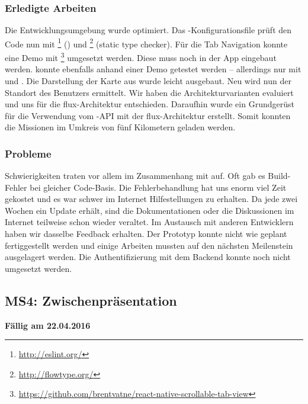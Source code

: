 \subsubsection{Erledigte Arbeiten}
Die Entwicklungsumgebung wurde optimiert. Das -Konfigurationsfile prüft den Code nun mit \footnote{\url{http://eslint.org/}} () und \footnote{\url{http://flowtype.org/}} (static type checker).\newline
Für die Tab Navigation konnte eine Demo mit \footnote{\url{https://github.com/brentvatne/react-native-scrollable-tab-view}} umgesetzt werden. Diese muss noch in der \kort{} App eingebaut werden.\newline
{} konnte ebenfalls anhand einer Demo getestet werden – allerdings nur mit  und .\newline
Die Darstellung der Karte aus  wurde leicht ausgebaut. Neu wird nun der Standort des Benutzers ermittelt.
Wir haben die Architekturvarianten evaluiert und uns für die flux-Architektur entschieden.
Daraufhin wurde ein Grundgerüst für die Verwendung vom \kort{}-API mit der flux-Architektur erstellt. 
Somit konnten die Missionen im Umkreis von fünf Kilometern geladen werden.

\subsubsection{Probleme}
Schwierigkeiten traten vor allem im Zusammenhang mit  auf.
Oft gab es Build-Fehler bei gleicher Code-Basis.
Die Fehlerbehandlung hat uns enorm viel Zeit gekostet und es war schwer im Internet Hilfestellungen zu erhalten.
Da  jede zwei Wochen ein Update erhält, sind die Dokumentationen oder die Diskussionen im Internet teilweise schon wieder veraltet.\newline
Im Austausch mit anderen  Entwicklern haben wir dasselbe Feedback erhalten.\newline
Der Prototyp konnte nicht wie geplant fertiggestellt werden und einige Arbeiten mussten auf den nächsten Meilenstein ausgelagert werden.
Die Authentifizierung mit dem Backend konnte noch nicht umgesetzt werden.

\subsection{MS4: Zwischenpräsentation}
\label{pm-ms4}
\textbf{Fällig am 22.04.2016}
